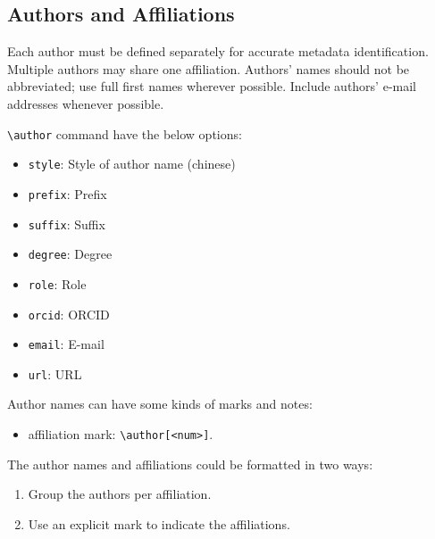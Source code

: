 \documentclass[
]{ceurart}
\begin{document}


\subsection{Authors and Affiliations}

Each author must be defined separately for accurate metadata
identification. Multiple authors may share one affiliation. Authors'
names should not be abbreviated; use full first names wherever
possible. Include authors' e-mail addresses whenever possible.

\verb|\author| command have the below options:

\begin{itemize}
\item \verb|style|: Style of author name (chinese)
\item \verb|prefix|: Prefix
\item \verb|suffix|: Suffix
\item \verb|degree|: Degree
\item \verb|role|: Role
\item \verb|orcid|: ORCID
\item \verb|email|: E-mail
\item \verb|url|: URL
\end{itemize}

Author names can have some kinds of marks and notes:
\begin{itemize}
\item affiliation mark: \verb|\author[<num>]|.
\end{itemize}

The author names and affiliations could be formatted in two ways:
\begin{enumerate}
\item Group the authors per affiliation.
\item Use an explicit mark to indicate the affiliations.
\end{enumerate}
\end{document}
